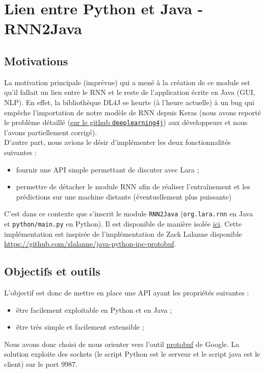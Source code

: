 \documentclass[10pt,a4paper]{article}
\newcommand\tab[1][0.5cm]{\hspace*{#1}}
\begin{document}
\section{Lien entre Python et Java - RNN2Java}
\subsection{Motivations}
La motivation principale (imprévue) qui a mené à la création de ce module est qu'il fallait un lien entre le RNN et le reste de l'application écrite en Java (GUI, NLP). En effet, la bibliothèque DL4J se heurte (à l'heure actuelle) à un bug qui empêche l'importation de notre modèle de RNN depuis Keras (nous avons reporté le problème détaillé (\href{https://github.com/eclipse/deeplearning4j/issues/8924}{sur le github \texttt{deeplearning4j}}) aux développeurs et nous l'avons partiellement corrigé). \\
\tab D'autre part, nous avions le désir d'implémenter les deux fonctionnalités suivantes :
\begin{itemize}
\item fournir une API simple permettant de discuter avec Lara ;
\item permettre de détacher le module RNN afin de réaliser l'entraînement et les prédictions sur une machine distante (éventuellement plus puissante)
\end{itemize}
C'est dans ce contexte que s'inscrit le module \texttt{RNN2Java} (\texttt{org.lara.rnn} en Java et \texttt{python/main.py} en Python). Il est disponible de manière isolée \href{https://github.com/LaraProject/rnn2java}{ici}. Cette implémentation est inspirée de l'implémentation de Zack Lalanne disponible \href{ici}{https://github.com/zlalanne/java-python-ipc-protobuf}.
\subsection{Objectifs et outils}
L'objectif est donc de mettre en place une API ayant les propriétés suivantes :
\begin{itemize}
\item être facilement exploitable en Python et en Java ;
\item être très simple et facilement extensible ;
\end{itemize}
Nous avons donc choisi de nous orienter vers l'outil \href{https://developers.google.com/protocol-buffers}{protobuf} de Google. La solution exploite des sockets (le script Python est le serveur et le script java est le client) sur le port 9987.
\end{document}
